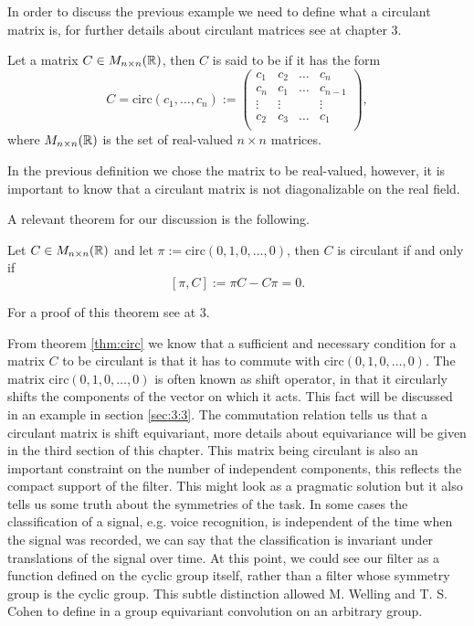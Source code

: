 \documentclass[../3.tex]{subfiles}
\begin{document}
    In order to discuss the previous example we need to define what a circulant matrix is, for further details about circulant matrices see \cite{circulant} at chapter 3.
    
    \begin{defn}
        Let a matrix $C \in M_{n \times n}(\mathbb{R})$, then $C$ is said to be  if it has the form 
        \[ C = \text{circ}(c_1, \dots, c_n) := 
        \begin{pmatrix}
            c_1 & c_2 & \dots & c_n \\
            c_n & c_1 & \dots & c_{n-1}\\
            \vdots & \vdots &  & \vdots \\
            c_2 & c_3 & \dots & c_1 \\
        \end{pmatrix}, \] 
        where $M_{n \times n}(\mathbb{R})$ is the set of real-valued $n \times n$ matrices.
    \end{defn}

    \begin{rem}
        In the previous definition we chose the matrix to be real-valued, however, it is important to know that a circulant matrix is not
        diagonalizable on the real field.
    \end{rem}

    A relevant theorem for our discussion is the following.

    \begin{thm}
        Let $C \in M_{n \times n}(\mathbb{R})$ and let $\pi := \text{circ}(0,1,0,\dots,0)$, then $C$ is circulant if and only if
        \[ [\pi, C] := \pi C - C \pi = 0 . \]
        \label{thm:circ}
    \end{thm}
    
    For a proof of this theorem see \cite{circulant} at 3.

    From theorem \ref{thm:circ} we know that a sufficient and necessary condition for a matrix $C$ to be circulant is that it has to commute
    with $\text{circ}(0,1,0,\dots,0)$.
    The matrix $\text{circ}(0,1,0,\dots,0)$ is often known as shift operator, in that it circularly shifts the components of the vector on which it acts.
    This fact will be discussed in an example in section \ref{sec:3:3}.
    The commutation relation tells us that a circulant matrix is shift equivariant, more details about equivariance will be given in the third section
    of this chapter. This matrix being circulant is also an important constraint on the number of independent components, this reflects the compact support of the filter.
    This might look as a pragmatic solution but it also tells us some truth about the symmetries of the task.
    In some cases the classification of a signal, e.g. voice recognition, is independent of the time when the signal was recorded,
    we can say that the classification is invariant under translations of the signal over time. 
    At this point, we could see our filter as a function defined on the cyclic group itself, rather than a filter whose symmetry group is the cyclic group.
    This subtle distinction allowed M. Welling and T. S. Cohen to define in \cite{gcnn} a group equivariant convolution on an arbitrary group.
    
\end{document}
